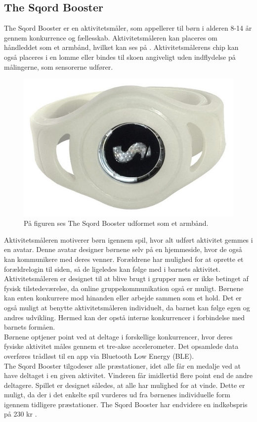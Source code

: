 \subsection{The Sqord Booster}
The Sqord Booster er en aktivitetsmåler, som appellerer til børn i alderen 8-14 år gennem konkurrence og fællesskab. Aktivitetsmåleren kan placeres om håndleddet som et armbånd, hvilket kan ses på . Aktivitetsmålerens chip kan også placeres i en lomme eller bindes til skoen angiveligt uden indflydelse på målingerne, som sensorerne udfører. 
\begin{figure}[H]
	\centering
	\includegraphics[scale=0.25]{figures/aProblemanalyse/sqord.JPG}
	\caption{På figuren ses The Sqord Booster udformet som et armbånd. \citep{Sqord2016}}
	\label{fig:sqord}
\end{figure}\vspace{-.25cm}
Aktivitetsmåleren motiverer børn igennem spil, hvor alt udført aktivitet gemmes i en avatar. Denne avatar designer børnene selv på en hjemmeside, hvor de også kan kommunikere med deres venner. Forældrene har mulighed for at oprette et forældrelogin til siden, så de ligeledes kan følge med i barnets aktivitet. Aktivitetsmåleren er designet til at blive brugt i grupper men er ikke betinget af fysisk tilstedeværelse, da online gruppekommunikation også er muligt. Børnene kan enten konkurrere mod hinanden eller arbejde sammen som et hold. Det er også muligt at benytte aktivitetsmåleren individuelt, da barnet kan følge egen og andres udvikling. Hermed kan der opstå interne konkurrencer i forbindelse med barnets formåen. \citep{Sqord_family2015,Sqord_group2015} \\
Børnene optjener point ved at deltage i forskellige konkurrencer, hvor deres fysiske aktivitet måles gennem et tre-akse accelerometer. Det opsamlede data overføres trådløst til en app via Bluetooth Low Energy (BLE). \citep{Sqord_family2015} \\
The Sqord Booster tilgodeser alle præstationer, idet alle får en medalje ved at have deltaget i en given aktivitet. Vinderen får imidlertid flere point end de andre deltagere. Spillet er designet således, at alle har mulighed for at vinde. Dette er muligt, da der i det enkelte spil vurderes ud fra børnenes individuelle form igennem tidligere præstationer. \citep{Sqord_family2015} \newline
The Sqord Booster har endvidere en indkøbspris på 230 kr \citep{Sqord_family2015}. 


